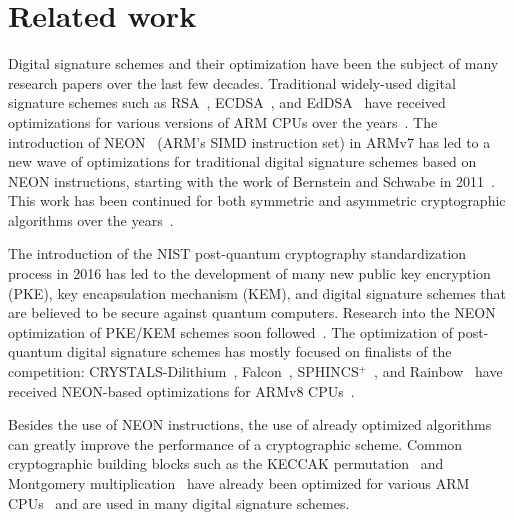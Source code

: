 \documentclass[11pt,a4paper]{report}
\theoremstyle{definition}
\begin{document}
\section{Related work}
Digital signature schemes and their optimization have been the subject of many research papers over the last few decades. Traditional widely-used digital signature schemes such as RSA~\cite{rivest1978method}, ECDSA~\cite{johnson2001elliptic}, and EdDSA~\cite{bernstein2012high} have received optimizations for various versions of ARM CPUs over the years~\cite{talal2009efficient,tanik2001ecdsa,xu2001efficient}. The introduction of NEON~\cite{ARMv8A-ProgrammersGuide} (ARM's SIMD instruction set) in ARMv7 has led to a new wave of optimizations for traditional digital signature schemes based on NEON instructions, starting with the work of Bernstein and Schwabe in 2011~\cite{bernstein2012neon}. This work has been continued for both symmetric and asymmetric cryptographic algorithms over the years~\cite{azarderaksh2015neon,gouvea2015implementing,seo2016efficient,seo2014parallel,wang2015higher}.

The introduction of the NIST post-quantum cryptography standardization process in 2016 has led to the development of many new public key encryption (PKE), key encapsulation mechanism (KEM), and digital signature schemes that are believed to be secure against quantum computers. Research into the NEON optimization of PKE/KEM schemes soon followed~\cite{nguyen2021fast,nguyen2021optimized,ortiz2022evaluation,streit2018post}. The optimization of post-quantum digital signature schemes has mostly focused on finalists of the competition: CRYSTALS-Dilithium~\cite{ducas2018crystals}, Falcon~\cite{fouque2018falcon}, SPHINCS$^+$~\cite{bernstein2015sphincs}, and Rainbow~\cite{ding2005rainbow} have received NEON-based optimizations for ARMv8 CPUs~\cite{becker2021neon,becker2022hybrid,kim2022accelerating,kim2022crystals,kwon2023look,nguyen2023fast}.

Besides the use of NEON instructions, the use of already optimized algorithms can greatly improve the performance of a cryptographic scheme. Common cryptographic building blocks such as the KECCAK permutation~\cite{bertoni2013keccak} and Montgomery multiplication~\cite{montgomery1985modular} have already been optimized for various ARM CPUs~\cite{becker2022hybrid,bos2014montgomery,seo2015montgomery} and are used in many digital signature schemes.
\end{document}
